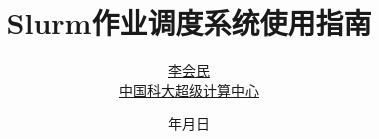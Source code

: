 \documentclass[12pt,a4paper]{article}
\begin{document}
\title{\bf\huge{Slurm作业调度系统使用指南}}
\author{\href{http://hmli.ustc.edu.cn}{李会民}\\ \href{http://scc.ustc.edu.cn}{中国科大超级计算中心}}
\renewcommand{\today}{\number\year 年\number\month 月\number\day 日}
\date{\today}

\maketitle
\tableofcontents

%
\newpage

\newpage

\end{document}
